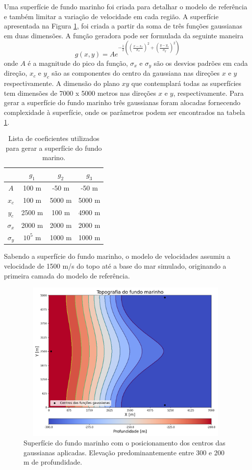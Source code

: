 Uma superfície de fundo marinho foi criada para detalhar o modelo de referência e também limitar a variação de velocidade em cada região. A superfície apresentada na Figura \ref{fig:water_bottom_surface_gaussian}, foi criada a partir da soma de três funções gaussianas em duas dimensões. A função geradora pode ser formulada da seguinte maneira
\begin{equation}
	g(x,y) = Ae^{-\frac{1}{2}\left( \left(\frac{x - x_c}{\sigma_x}\right)^2 + \left(\frac{y - y_c}{\sigma_y}\right)^2 \right)}   
	\label{gaussian_function}
\end{equation} 
\noindent onde $A$ é a magnitude do pico da função, $\sigma_x$ e $\sigma_y$ são os desvios padrões em cada direção, $x_c$ e $y_c$ são as componentes do centro da gaussiana nas direções $x$ e $y$ respectivamente. A dimensão do plano $xy$ que contemplará todas as superfícies tem dimensões de 7000 x 5000 metros nas direções $x$ e $y$, respectivamente. Para gerar a superfície do fundo marinho três gaussianas foram alocadas fornecendo complexidade à superfície, onde os parâmetros podem ser encontrados na tabela \ref{water_bottom_gaussian_coefs}.  
\begin{table}[H]
	\caption{Lista de coeficientes utilizados para gerar a superfície do fundo marino.}
	\begin{tabular}{c|ccc}
		& $g_1$    & $g_2$  & $g_3$ \\ \hline 
		$A$        & 100 m    & -50 m  & -50 m \\ \hline
		$x_c$      & 100 m    & 5000 m & 5000 m  \\ \hline
		$y_c$      & 2500 m   & 100 m  & 4900 m  \\ \hline
		$\sigma_x$ & 2000 m   & 2000 m & 2000 m  \\ \hline
		$\sigma_y$ & $10^5$ m & 1000 m & 1000 m
	\end{tabular}
	\label{water_bottom_gaussian_coefs}
\end{table}
\noindent Sabendo a superfície do fundo marinho, o modelo de velocidades assumiu a velocidade de 1500 m/s do topo até a base do mar simulado, originando a primeira camada do modelo de referência. 
\begin{figure}[H]
	\centering
	\includegraphics[width=11cm,height=8cm]{Imgs/Metodologia/water_bottom_surface_gaussian.png}
	\caption{Superfície do fundo marinho com o posicionamento dos centros das gaussianas aplicadas. Elevação predominantemente entre 300 e 200 m de profundidade.}
	\label{fig:water_bottom_surface_gaussian}	
\end{figure}
